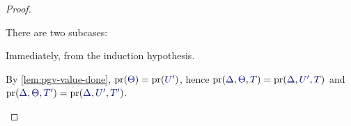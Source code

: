 \begin{proof}
\begin{case*}
\begin{mathpar}
    \end{mathpar}
  \end{case*}
  \begin{case*}
    \begin{mathpar}
    \end{mathpar}
  \end{case*}
  \begin{case*}
    There are two subcases:
    \begin{subcase*}[$\tm{x}\in\tm{L}$]
      Immediately, from the induction hypothesis.
      \begin{mathpar}
      \end{mathpar}
    \end{subcase*}
    \begin{subcase*}[$\tm{x}\in\tm{M}$ and $\tm{x}\in\tm{N}$]
      By \cref{lem:pgv-value-done}, $\pr(\ty{\Theta})=\pr(\ty{U'})$, hence $\pr(\ty{\Delta},\ty{\Theta},\ty{T})=\pr(\ty{\Delta},\ty{U'},\ty{T})$ and $\pr(\ty{\Delta},\ty{\Theta},\ty{T'})=\pr(\ty{\Delta},\ty{U'},\ty{T'})$.

\end{subcase*}
\end{case*}
\end{proof}

